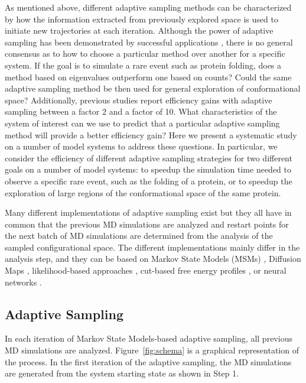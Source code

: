 As mentioned above, different adaptive sampling methods can be characterized by how the
information extracted from previously explored space is used to
initiate new trajectories at each iteration.
Although the power of adaptive sampling has been demonstrated by successful
applications \cite{Wieczorek2016,Plattner20171005,Kohlhoff201415}, there is no general consensus as to how to
choose a particular method over another for a specific system. If the goal is
to simulate a rare event such as protein folding, does a method based on eigenvalues
outperform one based on counts? Could the same adaptive sampling method be then
used for general exploration of conformational space? Additionally, previous
studies \cite{preto2014fast,weber2011characterization,bowman2010enhanced,Fabritiis-2014} report efficiency gains with
adaptive sampling between a factor 2 and a factor of 10. What characteristics of the system of
interest can we use to predict that a particular adaptive sampling method will
provide a better efficiency gain?  Here we present a systematic study on a
number of model systems to address these questions.
In particular, we consider the efficiency of different adaptive sampling strategies for
two different goals on a number of model systems: to speedup the simulation
time needed to observe a specific rare event, such as the folding of a protein,
or to speedup the exploration of large regions of the conformational space of
the same protein.


Many different implementations of adaptive sampling exist but they all 
have in common
that the previous MD simulations are analyzed and restart points for the next
batch of MD simulations are determined from the analysis of the sampled configurational space.
The different implementations mainly differ in the analysis step, and
they can be based on Markov State Models (MSMs) \cite{prinz2011markov,
MSM-Pande-2018,bookmsm,masterequationsMSM,SCHUTTE1999146}, Diffusion Maps
\cite{Coifman7426, rohrdanz2011determination,Zheng2011, Boninsegna2015},
likelihood-based approaches \cite{peters2006obtaining}, cut-based free energy
profiles \cite{krivov2008diffusive}, or neural networks
\cite{Mardt2018,wehmeyer2018time, ribeiro2018reweighted}. 

\subsection{\label{sec:adaptive-sampling} Adaptive Sampling}

In each iteration of Markov State Models-based adaptive sampling, all previous
MD simulations are analyzed.
Figure~\ref{fig:schema} is a graphical representation of the process. In the
first iteration of the adaptive sampling, the MD simulations are generated from
the system starting state as shown in Step 1.

